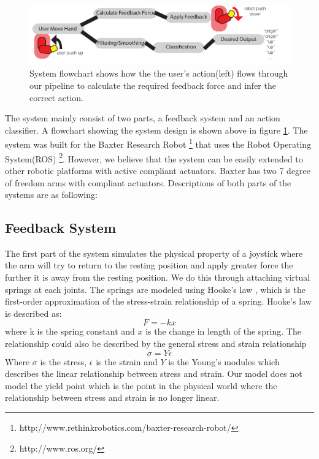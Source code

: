 \begin{figure}[H]
  \centering
    \includegraphics[width=\textwidth]{graph1}
  \caption{System flowchart shows how the the user's action(left) flows through our pipeline to calculate the required feedback force and infer the correct action.}
  \label{fig:sys}
\end{figure}
The system mainly consist of two parts, a feedback system and an action classifier. A flowchart showing the system design is shown above in figure \ref{fig:sys}. The system was built for the Baxter Research Robot \footnote{http://www.rethinkrobotics.com/baxter-research-robot/} that uses the Robot Operating System(ROS) \footnote{http://www.ros.org/}. However, we believe that the system can be easily extended to other robotic platforms with active compliant actuators. Baxter has two 7 degree of freedom arms with compliant actuators. Descriptions of both parts of the systems are as following:


\subsection{Feedback System}
The first part of the system simulates the physical property of a joystick where the arm will try to return to the resting position and apply greater force the further it is away from the resting position. We do this through attaching virtual springs at each joints. The springs are modeled using Hooke's law \cite{wiki:hooke}, which is the first-order approximation of the stress-strain relationship of a spring. Hooke's law is described as:
\begin{equation}
F = -kx
\end{equation}
where k is the spring constant and $x$ is the change in length of the spring. The relationship could also be described by the general stress and strain relationship
\begin{equation}
\sigma = Y \epsilon
\end{equation}
Where $\sigma$ is the stress, $\epsilon$ is the strain and $Y$ is the Young's modules which describes the linear relationship between stress and strain. Our model does not model the yield point which is the point in the physical world where the relationship between stress and strain is no longer linear.

